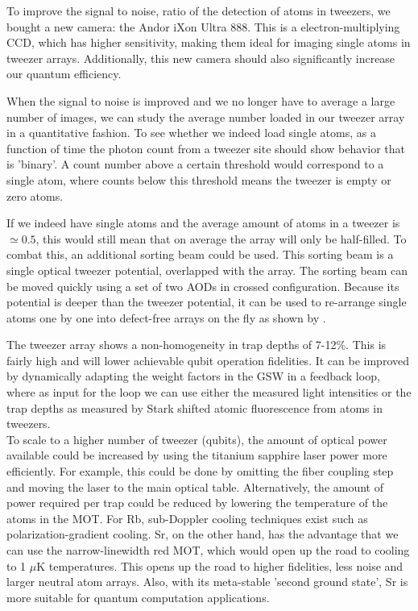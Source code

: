 \noindent To improve the signal to noise, ratio of the detection of atoms in tweezers, we bought a new camera: the Andor iXon Ultra 888.
This is a electron-multiplying \ac{CCD}, which has higher sensitivity, making them ideal for imaging single atoms in tweezer arrays.
Additionally, this new camera should also significantly increase our quantum efficiency.
    
When the signal to noise is improved and we no longer have to average a large number of images, we can study the average number loaded in our tweezer array in a quantitative fashion.
To see whether we indeed load single atoms, as a function of time the photon count from a tweezer site should show behavior that is 'binary'. A count number above a certain threshold would correspond to a single atom, where counts below this threshold means the tweezer is empty or zero atoms. 
    
If we indeed have single atoms and the average amount of atoms in a tweezer is $\simeq 0.5$, this would still mean that on average the array will only be half-filled.
To combat this, an additional sorting beam could be used. 
This sorting beam is a single optical tweezer potential, overlapped with the array. 
The sorting beam can be moved quickly using a set of two \ac{AOD}s in crossed configuration.
Because its potential is deeper than the tweezer potential, it can be used to re-arrange single atoms one by one into defect-free arrays on the fly as shown by \cite{Barredo2016}.

The tweezer array shows a non-homogeneity in trap depths of 7-12\%. This is fairly high and will lower achievable qubit operation fidelities.
It can be improved by dynamically adapting the weight factors in the \ac{GSW} in a feedback loop, where as input for the loop we can use either the measured light intensities or the trap depths as measured by Stark shifted atomic fluorescence from atoms in tweezers. \\

    
\noindent To scale to a higher number of tweezer (qubits), the amount of optical power available could be increased by using the titanium sapphire laser power more efficiently. 
For example, this could be done by omitting the fiber coupling step and moving the laser to the main optical table. 
Alternatively, the amount of power required per trap could be reduced by lowering the temperature of the atoms in the MOT. 
For Rb, sub-Doppler cooling techniques exist such as polarization-gradient cooling. 
Sr, on the other hand, has the advantage that we can use the narrow-linewidth red MOT, which would open up the road to cooling to 1 $\mu$K temperatures.
This opens up the road to higher fidelities, less noise and larger neutral atom arrays. 
Also, with its meta-stable 'second ground state', Sr is more suitable for quantum computation applications.
    
